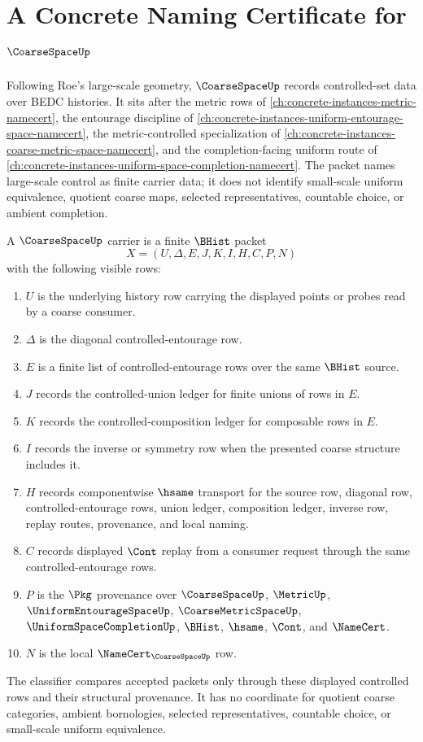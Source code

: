 \chapter{A Concrete Naming Certificate for $\CoarseSpaceUp$}
\label{ch:concrete-instances-coarse-space-namecert}

Following Roe's large-scale geometry, $\CoarseSpaceUp$ records controlled-set data over BEDC histories. It sits after the metric rows of \autoref{ch:concrete-instances-metric-namecert}, the entourage discipline of \autoref{ch:concrete-instances-uniform-entourage-space-namecert}, the metric-controlled specialization of \autoref{ch:concrete-instances-coarse-metric-space-namecert}, and the completion-facing uniform route of \autoref{ch:concrete-instances-uniform-space-completion-namecert}. The packet names large-scale control as finite carrier data; it does not identify small-scale uniform equivalence, quotient coarse maps, selected representatives, countable choice, or ambient completion.

\begin{definition}
\label{def:coarse-space-carrier}
A $\CoarseSpaceUp$ carrier is a finite $\BHist$ packet
$$
X=(U,\Delta,E,J,K,I,H,C,P,N)
$$
with the following visible rows:
\begin{enumerate}
\item $U$ is the underlying history row carrying the displayed points or probes read by a coarse consumer.
\item $\Delta$ is the diagonal controlled-entourage row.
\item $E$ is a finite list of controlled-entourage rows over the same $\BHist$ source.
\item $J$ records the controlled-union ledger for finite unions of rows in $E$.
\item $K$ records the controlled-composition ledger for composable rows in $E$.
\item $I$ records the inverse or symmetry row when the presented coarse structure includes it.
\item $H$ records componentwise $\hsame$ transport for the source row, diagonal row, controlled-entourage rows, union ledger, composition ledger, inverse row, replay routes, provenance, and local naming.
\item $C$ records displayed $\Cont$ replay from a consumer request through the same controlled-entourage rows.
\item $P$ is the $\Pkg$ provenance over $\CoarseSpaceUp$, $\MetricUp$, $\UniformEntourageSpaceUp$, $\CoarseMetricSpaceUp$, $\UniformSpaceCompletionUp$, $\BHist$, $\hsame$, $\Cont$, and $\NameCert$.
\item $N$ is the local $\NameCert_{\CoarseSpaceUp}$ row.
\end{enumerate}
The classifier compares accepted packets only through these displayed controlled rows and their structural provenance. It has no coordinate for quotient coarse categories, ambient bornologies, selected representatives, countable choice, or small-scale uniform equivalence.
\end{definition}


